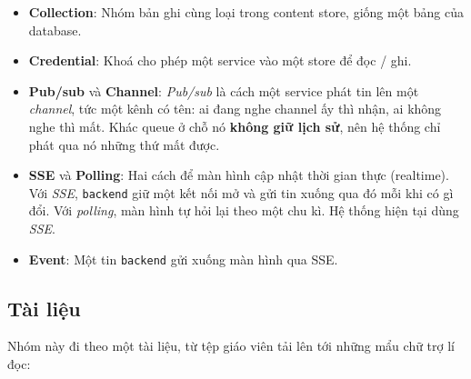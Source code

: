 \begin{itemize}
        khác nhau, nên mỗi loại mang chữ riêng:
        \emph{database} giữ dữ liệu có cấu trúc, \emph{object store} giữ byte của tệp,
        \emph{content store} giữ nội dung đã xử lí của tài liệu, như chữ từng trang và cây mục lục,
        và \emph{queue} giữ job đang chờ.
  \item \textbf{Collection}: Nhóm bản ghi cùng loại trong content store, giống một bảng của
        database. 
  \item \textbf{Credential}: Khoá cho phép một service vào một store để đọc / ghi. 
  \item \textbf{Pub/sub} và \textbf{Channel}: \emph{Pub/sub} là cách một service phát tin lên một
        \emph{channel}, tức một kênh có tên: ai đang nghe channel ấy thì nhận, ai không nghe thì mất.
        Khác queue ở chỗ nó \textbf{không giữ lịch sử}, nên hệ thống chỉ phát qua nó những thứ mất
        được. 
  \item \textbf{SSE} và \textbf{Polling}: Hai cách để màn hình cập nhật thời gian thực (realtime). Với \emph{SSE},
        \texttt{backend} giữ một kết nối mở và gửi tin xuống qua đó mỗi khi có gì đổi. Với
        \emph{polling}, màn hình tự hỏi lại theo một chu kì. Hệ thống hiện tại dùng \emph{SSE}.
  \item \textbf{Event}: Một tin \texttt{backend} gửi xuống màn hình qua SSE. 
\end{itemize}

\subsection{Tài liệu}

Nhóm này đi theo một tài liệu, từ tệp giáo viên tải lên tới những mẩu chữ trợ lí đọc:

